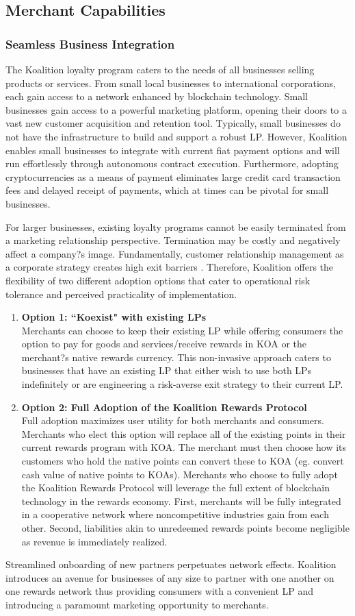\subsection{Merchant Capabilities}

\subsubsection{Seamless Business Integration}
The Koalition loyalty program caters to the needs of all businesses selling products or services. From small local businesses to international corporations, each gain access to a network enhanced by blockchain technology. Small businesses gain access to a powerful marketing platform, opening their doors to a vast new customer acquisition and retention tool. Typically, small businesses do not have the infrastructure to build and support a robust LP. However, Koalition enables small businesses to integrate with current fiat payment options and will run effortlessly through autonomous contract execution. Furthermore, adopting cryptocurrencies as a means of payment eliminates large credit card transaction fees and delayed receipt of payments, which at times can be pivotal for small businesses.

For larger businesses, existing loyalty programs cannot be easily terminated from a marketing relationship perspective. Termination may be costly and negatively affect a company?s image. Fundamentally, customer relationship management as a corporate strategy creates high exit barriers \cite{Rehnen16}. Therefore, Koalition offers the flexibility of two different adoption options that cater to operational risk tolerance and perceived practicality of implementation.  


\begin{enumerate}
\item \textbf{Option 1: ``Koexist" with existing LPs} \\
Merchants can choose to keep their existing LP while offering consumers the option to pay for goods and services/receive rewards in KOA or the merchant?s native rewards currency. This non-invasive approach caters to businesses that have an existing LP that either wish to use both LPs indefinitely or are engineering a risk-averse exit strategy to their current LP.

\item \textbf{Option 2: Full Adoption of the Koalition Rewards Protocol} \\
Full adoption maximizes user utility for both merchants and consumers. Merchants who elect this option will replace all of the existing points in their current rewards program with KOA. The merchant must then choose how its customers who hold the native points can convert these to KOA (eg. convert cash value of native points to KOAs). Merchants who choose to fully adopt the Koalition Rewards Protocol will leverage the full extent of blockchain technology in the rewards economy. First, merchants will be fully integrated in a cooperative network where noncompetitive industries gain from each other. Second, liabilities akin to unredeemed rewards points become negligible as revenue is immediately realized.
\end{enumerate}

Streamlined onboarding of new partners perpetuates network effects. Koalition introduces an avenue for businesses of any size to partner with one another on one rewards network thus providing consumers with a convenient LP and introducing a paramount marketing opportunity to merchants. 
